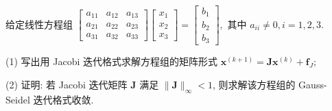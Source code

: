  \begin{tcolorbox}[enhanced,colback=10,colframe=9,breakable,coltitle=green!25!black,title=2024]
 给定线性方程组
$
\left[\begin{array}{lll}
a_{11} & a_{12} & a_{13} \\
a_{21} & a_{22} & a_{23} \\
a_{31} & a_{32} & a_{33}
\end{array}\right]\left[\begin{array}{l}
x_{1} \\
x_{2} \\
x_{3}
\end{array}\right]=\left[\begin{array}{l}
b_{1} \\
b_{2} \\
b_{3}
\end{array}\right],
$
其中 $ a_{i i} \neq 0, i=1,2,3 $.

(1) 写出用 Jacobi 迭代格式求解方程组的矩阵形式 $ \boldsymbol{x}^{(k+1)}=\boldsymbol{J} \boldsymbol{x}^{(k)}+\boldsymbol{f}_{J} $;

(2) 证明: 若 Jacobi 迭代矩阵 $ \boldsymbol{J} $ 满足 $ \|\boldsymbol{J}\|_{\infty}<1 $, 则求解该方程组的 Gauss-Seidel 迭代格式收敛.


\end{tcolorbox}
